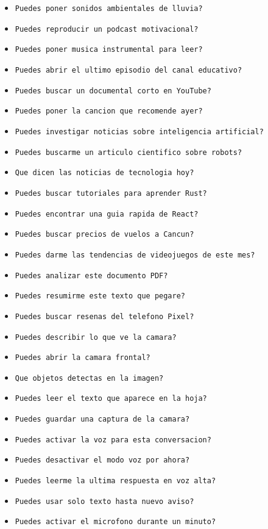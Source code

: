 \documentclass[a4paper,12pt]{article}
\begin{document}
\begin{itemize}
    \item \texttt{Puedes poner sonidos ambientales de lluvia?}
    \item \texttt{Puedes reproducir un podcast motivacional?}
    \item \texttt{Puedes poner musica instrumental para leer?}
    \item \texttt{Puedes abrir el ultimo episodio del canal educativo?}
    \item \texttt{Puedes buscar un documental corto en YouTube?}
    \item \texttt{Puedes poner la cancion que recomende ayer?}
    \item \texttt{Puedes investigar noticias sobre inteligencia artificial?}
    \item \texttt{Puedes buscarme un articulo cientifico sobre robots?}
    \item \texttt{Que dicen las noticias de tecnologia hoy?}
    \item \texttt{Puedes buscar tutoriales para aprender Rust?}
    \item \texttt{Puedes encontrar una guia rapida de React?}
    \item \texttt{Puedes buscar precios de vuelos a Cancun?}
    \item \texttt{Puedes darme las tendencias de videojuegos de este mes?}
    \item \texttt{Puedes analizar este documento PDF?}
    \item \texttt{Puedes resumirme este texto que pegare?}
    \item \texttt{Puedes buscar resenas del telefono Pixel?}
    \item \texttt{Puedes describir lo que ve la camara?}
    \item \texttt{Puedes abrir la camara frontal?}
    \item \texttt{Que objetos detectas en la imagen?}
    \item \texttt{Puedes leer el texto que aparece en la hoja?}
    \item \texttt{Puedes guardar una captura de la camara?}
    \item \texttt{Puedes activar la voz para esta conversacion?}
    \item \texttt{Puedes desactivar el modo voz por ahora?}
    \item \texttt{Puedes leerme la ultima respuesta en voz alta?}
    \item \texttt{Puedes usar solo texto hasta nuevo aviso?}
    \item \texttt{Puedes activar el microfono durante un minuto?}

\end{itemize}
\end{document}
